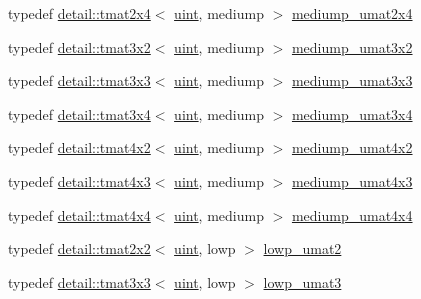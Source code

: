\begin{DoxyCompactItemize}
\item 
typedef \hyperlink{structglm_1_1detail_1_1tmat2x4}{detail\+::tmat2x4}$<$ \hyperlink{group__core__precision_ga4fd29415871152bfb5abd588334147c8}{uint}, mediump $>$ \hyperlink{group__gtc__matrix__integer_gaf79e9c80f024d31f3d66ddae75e90b6c}{mediump\+\_\+umat2x4}
\item 
typedef \hyperlink{structglm_1_1detail_1_1tmat3x2}{detail\+::tmat3x2}$<$ \hyperlink{group__core__precision_ga4fd29415871152bfb5abd588334147c8}{uint}, mediump $>$ \hyperlink{group__gtc__matrix__integer_ga65a9fdb1a5918fe6f308577065983e23}{mediump\+\_\+umat3x2}
\item 
typedef \hyperlink{structglm_1_1detail_1_1tmat3x3}{detail\+::tmat3x3}$<$ \hyperlink{group__core__precision_ga4fd29415871152bfb5abd588334147c8}{uint}, mediump $>$ \hyperlink{group__gtc__matrix__integer_ga31a05e7b2a6a596bdc7ceeb5d9c10e1c}{mediump\+\_\+umat3x3}
\item 
typedef \hyperlink{structglm_1_1detail_1_1tmat3x4}{detail\+::tmat3x4}$<$ \hyperlink{group__core__precision_ga4fd29415871152bfb5abd588334147c8}{uint}, mediump $>$ \hyperlink{group__gtc__matrix__integer_ga8113e067e1f327fac64cf9015c8c5431}{mediump\+\_\+umat3x4}
\item 
typedef \hyperlink{structglm_1_1detail_1_1tmat4x2}{detail\+::tmat4x2}$<$ \hyperlink{group__core__precision_ga4fd29415871152bfb5abd588334147c8}{uint}, mediump $>$ \hyperlink{group__gtc__matrix__integer_ga8ea45737e8bc9bfae2668968056b109f}{mediump\+\_\+umat4x2}
\item 
typedef \hyperlink{structglm_1_1detail_1_1tmat4x3}{detail\+::tmat4x3}$<$ \hyperlink{group__core__precision_ga4fd29415871152bfb5abd588334147c8}{uint}, mediump $>$ \hyperlink{group__gtc__matrix__integer_gaebe3b1b4b6030c096447e40fb00528f4}{mediump\+\_\+umat4x3}
\item 
typedef \hyperlink{structglm_1_1detail_1_1tmat4x4}{detail\+::tmat4x4}$<$ \hyperlink{group__core__precision_ga4fd29415871152bfb5abd588334147c8}{uint}, mediump $>$ \hyperlink{group__gtc__matrix__integer_ga24b1c76fefa58f810e24cafe0ea6a6a0}{mediump\+\_\+umat4x4}
\item 
typedef \hyperlink{structglm_1_1detail_1_1tmat2x2}{detail\+::tmat2x2}$<$ \hyperlink{group__core__precision_ga4fd29415871152bfb5abd588334147c8}{uint}, lowp $>$ \hyperlink{group__gtc__matrix__integer_ga09df85e6b5e53f66a86d042e0633bfbc}{lowp\+\_\+umat2}
\item 
typedef \hyperlink{structglm_1_1detail_1_1tmat3x3}{detail\+::tmat3x3}$<$ \hyperlink{group__core__precision_ga4fd29415871152bfb5abd588334147c8}{uint}, lowp $>$ \hyperlink{group__gtc__matrix__integer_ga7160c0ac500826224d3baf1003c0432c}{lowp\+\_\+umat3}

\end{DoxyCompactItemize}
